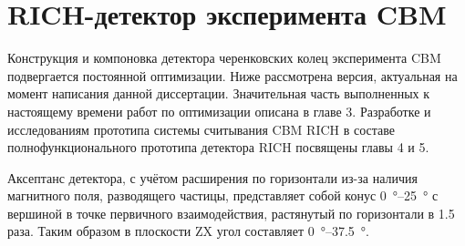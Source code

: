 \section{RICH-детектор эксперимента CBM}\label{sec:secCBMrich}





Конструкция и компоновка детектора черенковских колец эксперимента CBM подвергается постоянной оптимизации. Ниже рассмотрена версия, актуальная на момент написания данной диссертации. Значительная часть выполненных к настоящему времени работ по оптимизации описана в главе 3. Разработке и исследованиям прототипа системы считывания CBM RICH в составе полнофункционального прототипа детектора RICH посвящены главы 4 и 5. %


Аксептанс детектора, с учётом расширения по горизонтали из-за наличия магнитного поля, разводящего частицы, представляет собой конус \SI{0}{\degree}--\SI{25}{\degree} с вершиной в точке первичного взаимодействия, растянутый по горизонтали в 1.5 раза. Таким образом в плоскости ZX угол составляет \SI{0}{\degree}--\SI{37.5}{\degree}.

